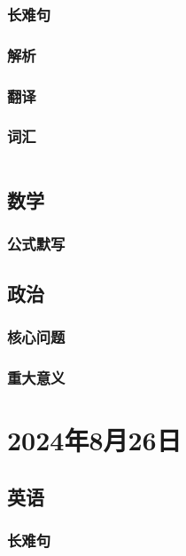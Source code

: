 \documentclass[UTF8]{ctexart}
\begin{document}
\subsubsection{长难句}
\subsubsection{解析}
\subsubsection{翻译}
\subsubsection{词汇}
\begin{table}[h]
      \centering
      \begin{tabular}{p{}p{}}
      \end{tabular}
\end{table}
\subsection{数学}
\subsubsection{公式默写}
\begin{multicols}{2}
\end{multicols}
\subsection{政治}
\subsubsection{}
\subsubsection{核心问题}
\subsubsection{重大意义}
\section{2024年8月26日}
\subsection{英语}
\subsubsection{长难句}
\end{document}
